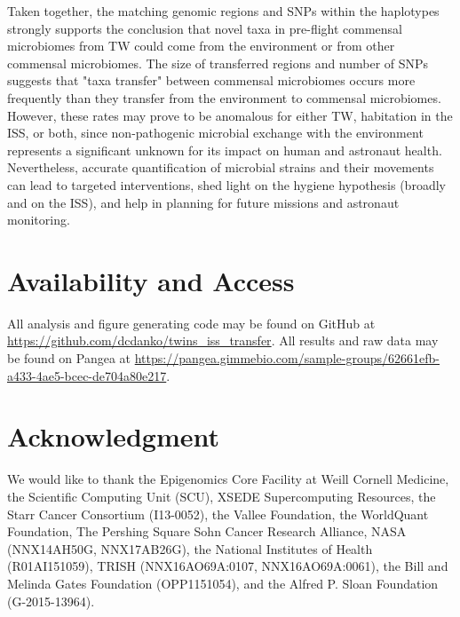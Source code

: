 Taken together, the matching genomic regions and SNPs within the haplotypes strongly supports the conclusion that novel taxa in pre-flight commensal microbiomes from TW could come from the environment or from other commensal microbiomes. The size of transferred regions and number of SNPs suggests that "taxa transfer" between commensal microbiomes occurs more frequently than they transfer from the environment to commensal microbiomes. However, these rates may prove to be anomalous for either TW, habitation in the ISS, or both, since non-pathogenic microbial exchange with the environment represents a significant unknown for its impact on human and astronaut health. Nevertheless, accurate quantification of microbial strains and their movements can lead to targeted interventions, shed light on the hygiene hypothesis (broadly and on the ISS), and help in planning for future missions and astronaut monitoring.

\section{Availability and Access}

All analysis and figure generating code may be found on GitHub at \url{https://github.com/dcdanko/twins_iss_transfer}. All results and raw data may be found on Pangea at \url{https://pangea.gimmebio.com/sample-groups/62661efb-a433-4ae5-bcec-de704a80e217}.

\section{Acknowledgment}

We would like to thank the Epigenomics Core Facility at Weill Cornell Medicine, the Scientific Computing Unit (SCU), XSEDE Supercomputing Resources, the Starr Cancer Consortium (I13-0052), the Vallee Foundation, the WorldQuant Foundation, The Pershing Square Sohn Cancer Research Alliance, NASA (NNX14AH50G, NNX17AB26G), the National Institutes of Health (R01AI151059), TRISH (NNX16AO69A:0107, NNX16AO69A:0061), the Bill and Melinda Gates Foundation (OPP1151054), 
 and the Alfred P. Sloan Foundation (G-2015-13964).


